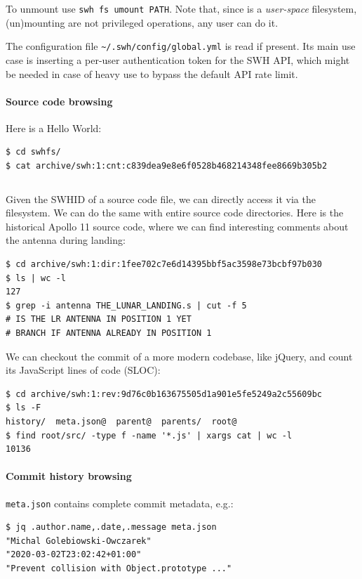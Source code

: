 To unmount \SWHFS{} use \texttt{swh fs umount PATH}. Note that, since
\SWHFS{}
is a \emph{user-space} filesystem, (un)mounting are not privileged operations,
any user can do it.

The configuration file \texttt{\~{}/.swh/config/global.yml} is read if
present. Its main use case is inserting a per-user authentication token for the
SWH API, which might be needed in case of heavy use to bypass the default API
rate limit.


\paragraph{Source code browsing}

Here is a \SWHFS{} Hello World:

\begin{verbatim}
$ cd swhfs/
$ cat archive/swh:1:cnt:c839dea9e8e6f0528b468214348fee8669b305b2
\end{verbatim}
\inputminted{c}{codesamples/swh-fuse/hello.c}

Given the SWHID of a source code file, we can directly access it via the
filesystem. We can do the same with entire source code directories. Here is the
historical Apollo 11 source code, where we can find interesting comments about
the antenna during landing:

\begin{verbatim}
$ cd archive/swh:1:dir:1fee702c7e6d14395bbf5ac3598e73bcbf97b030
$ ls | wc -l
127
$ grep -i antenna THE_LUNAR_LANDING.s | cut -f 5
# IS THE LR ANTENNA IN POSITION 1 YET
# BRANCH IF ANTENNA ALREADY IN POSITION 1
\end{verbatim}

We can checkout the commit of a more modern codebase, like jQuery, and count
its JavaScript lines of code (SLOC):

\begin{verbatim}
$ cd archive/swh:1:rev:9d76c0b163675505d1a901e5fe5249a2c55609bc
$ ls -F
history/  meta.json@  parent@  parents/  root@
$ find root/src/ -type f -name '*.js' | xargs cat | wc -l
10136
\end{verbatim}

\paragraph{Commit history browsing}

\texttt{meta.json} contains complete commit metadata, e.g.:

\begin{verbatim}
$ jq .author.name,.date,.message meta.json
"Michal Golebiowski-Owczarek"
"2020-03-02T23:02:42+01:00"
"Prevent collision with Object.prototype ..."
\end{verbatim}


